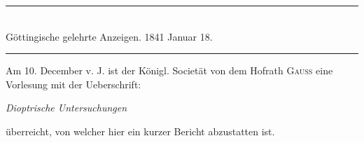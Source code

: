 \clearpage
{}
\GaussVSourceUnnumbered
{}
\begin{center}
\rule{.70\linewidth}{.4pt}\\[.7\baselineskip]
Göttingische gelehrte Anzeigen. 1841 Januar 18.\\[.7\baselineskip]
\rule{.70\linewidth}{.4pt}
\end{center}

Am 10. December v. J. ist der Königl. Societät von dem Hofrath \textsc{Gauss}
eine Vorlesung mit der Ueberschrift:
\begin{center}\textit{Dioptrische Untersuchungen}\end{center}
\noindent
überreicht, von welcher hier ein kurzer Bericht abzustatten ist.

